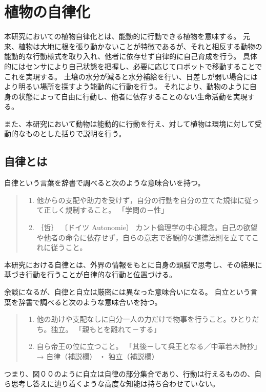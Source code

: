 \chapter{植物の自律化}
本研究においての植物自律化とは、能動的に行動できる植物を意味する。
元来、植物は大地に根を張り動かないことが特徴であるが、それと相反する動物の能動的な行動様式を取り入れ、他者に依存せず自律的に自己育成を行う。
具体的にはセンサにより自己状態を把握し、必要に応じてロボットで移動することでこれを実現する。
土壌の水分が減ると水分補給を行い、日差しが弱い場合にはより明るい場所を探すよう能動的に行動を行う。
それにより、動物のように自身の状態によって自由に行動し、他者に依存することのない生命活動を実現する。
\par また、本研究において動物は能動的に行動を行え、対して植物は環境に対して受動的なものとした括りで説明を行う。

\section{自律とは}
自律という言葉を辞書で調べると次のような意味合いを持つ。
\begin{quote}
\begin{enumerate}
    \item 他からの支配や助力を受けず，自分の行動を自分の立てた規律に従って正しく規制すること。 「学問の－性」

    \item ｛哲｝ 〔ドイツ Autonomie〕 カント倫理学の中心概念。自己の欲望や他者の命令に依存せず，自らの意志で客観的な道徳法則を立ててこれに従うこと。
\end{enumerate}
\end{quote}
本研究における自律とは、外界の情報をもとに自身の頭脳で思考し、その結果に基づき行動を行うことが自律的な行動と位置づける。
\par 余談になるが、自律と自立は厳密には異なった意味合いになる。
自立という言葉を辞書で調べると次のような意味合いを持つ。 
\begin{quote}
\begin{enumerate}
    \item 他の助けや支配なしに自分一人の力だけで物事を行うこと。ひとりだち。独立。 「親もとを離れて－する」

    \item 自ら帝王の位に立つこと。 「其後－して呉王となる／中華若木詩抄」 → 自律（補説欄） ・ 独立（補説欄）
\end{enumerate}
\end{quote}
つまり、図００のように自立は自律の部分集合であり、行動は行えるものの、自ら思考し答えに辿り着くような高度な知能は持ち合わせていない。



